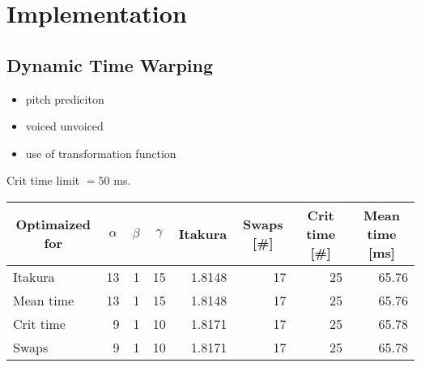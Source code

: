 \chapter{Implementation} %
\label{cha:implementation}


\section{Dynamic Time Warping} %
\label{imp:dynamic_time_warping}
\begin{itemize}
	\item pitch prediciton
	\item voiced unvoiced
	\item use of transformation function
\end{itemize}

Crit time limit $=50$ ms.

\begin{table}[htbp]
	\begin{center}
		\begin{tabular}{l|rrr|rrrr}
			\toprule
			\multicolumn{1}{c}{Optimaized for} & \multicolumn{1}{c}{$\alpha$} & \multicolumn{1}{c}{$\beta$} & \multicolumn{1}{c}{$\gamma$} & \multicolumn{1}{c}{Itakura} & \multicolumn{1}{c}{Swaps [\#]} & \multicolumn{1}{c}{Crit time [\#]} & \multicolumn{1}{c}{Mean time [ms]}\\
			\midrule
			Itakura & 13 & 1 & 15 & 1.8148 & 17 & 25 & 65.76\\
			Mean time & 13 & 1 & 15 & 1.8148 & 17 & 25 & 65.76\\
			Crit time & 9 & 1 & 10 & 1.8171 & 17 & 25 & 65.78\\
			Swaps & 9 & 1 & 10 & 1.8171 & 17 & 25 & 65.78\\
			\bottomrule			
		\end{tabular}		
	\end{center}
\label{tab:local_constraints}	
\end{table}



